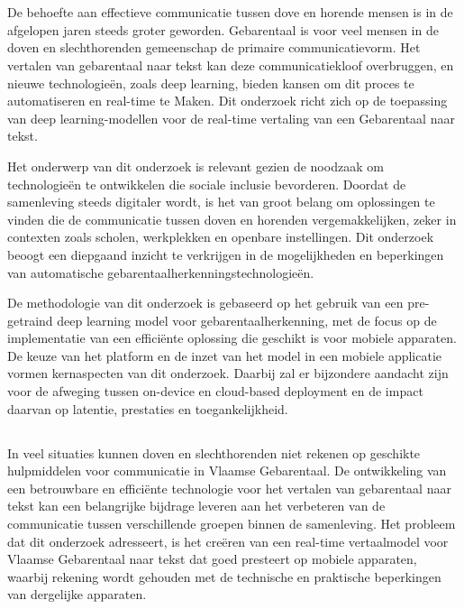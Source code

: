 
\chapter{}%
\label{ch:inleiding}

De behoefte aan effectieve communicatie tussen dove en horende mensen is in de afgelopen jaren steeds groter geworden. 
Gebarentaal is voor veel mensen in de doven en slechthorenden gemeenschap de primaire communicatievorm. 
Het vertalen van gebarentaal naar tekst kan deze communicatiekloof overbruggen, en nieuwe technologieën, zoals deep learning, bieden kansen om dit proces te automatiseren en real-time te Maken. 
Dit onderzoek richt zich op de toepassing van deep learning-modellen voor de real-time vertaling van een Gebarentaal naar tekst.

Het onderwerp van dit onderzoek is relevant gezien de noodzaak om technologieën te ontwikkelen die sociale inclusie bevorderen. 
Doordat de samenleving steeds digitaler wordt, is het van groot belang om oplossingen te vinden die de communicatie tussen doven en horenden vergemakkelijken, zeker in contexten zoals scholen, werkplekken en openbare instellingen. 
Dit onderzoek beoogt een diepgaand inzicht te verkrijgen in de mogelijkheden en beperkingen van automatische gebarentaalherkenningstechnologieën.

De methodologie van dit onderzoek is gebaseerd op het gebruik van een pre-getraind deep learning model voor gebarentaalherkenning, met de focus op de implementatie van een efficiënte oplossing die geschikt is voor mobiele apparaten. 
De keuze van het platform en de inzet van het model in een mobiele applicatie vormen kernaspecten van dit onderzoek. 
Daarbij zal er bijzondere aandacht zijn voor de afweging tussen on-device en cloud-based deployment en de impact daarvan op latentie, prestaties en toegankelijkheid.

\section{}%
\label{sec:probleemstelling}

In veel situaties kunnen doven en slechthorenden niet rekenen op geschikte hulpmiddelen voor communicatie in Vlaamse Gebarentaal.
De ontwikkeling van een betrouwbare en efficiënte technologie voor het vertalen van gebarentaal naar tekst kan een belangrijke bijdrage leveren aan het verbeteren van de communicatie tussen verschillende groepen binnen de samenleving. 
Het probleem dat dit onderzoek adresseert, is het creëren van een real-time vertaalmodel voor Vlaamse Gebarentaal naar tekst dat goed presteert op mobiele apparaten, waarbij rekening wordt gehouden met de technische en praktische beperkingen van dergelijke apparaten.

